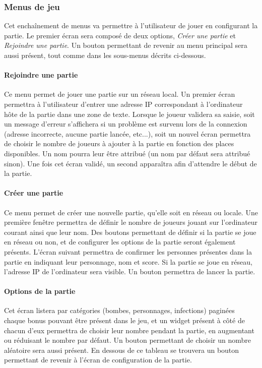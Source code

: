 \subsubsection{Menus de jeu}

Cet enchaînement de menus va permettre à l'utilisateur de jouer en configurant la partie. Le premier écran sera composé de deux options, \emph{Créer une partie} et \emph{Rejoindre une partie}. Un bouton permettant de revenir au menu principal sera aussi présent, tout comme dans les sous-menus décrits ci-dessous.

\paragraph{Rejoindre une partie}

Ce menu permet de jouer une partie sur un réseau local. Un premier écran permettra à l'utilisateur d'entrer une adresse IP correspondant à l'ordinateur hôte de la partie dans une zone de texte. Lorsque le joueur validera sa saisie, soit un message d'erreur s'affichera si un problème est survenu lors de la connexion (adresse incorrecte, aucune partie lancée, etc...), soit un nouvel écran permettra de choisir le nombre de joueurs à ajouter à la partie en fonction des places disponibles. Un nom pourra leur être attribué (un nom par défaut sera attribué sinon). Une fois cet écran validé, un second apparaîtra afin d'attendre le début de la partie.

\paragraph{Créer une partie}

Ce menu permet de créer une nouvelle partie, qu'elle soit en réseau ou locale. Une première fenêtre permettra de définir le nombre de joueurs jouant sur l'ordinateur courant ainsi que leur nom. Des boutons permettant de définir si la partie se joue en réseau ou non, et de configurer les options de la partie seront également présents. L'écran suivant permettra de confirmer les personnes présentes dans la partie en indiquant leur personnage, nom et score. Si la partie se joue en réseau, l'adresse IP de l'ordinateur sera visible. Un bouton permettra de lancer la partie.

\paragraph{Options de la partie}

Cet écran listera par catégories (bombes, personnages, infections) paginées chaque bonus pouvant être présent dans le jeu, et un widget présent à côté de chacun d'eux permettra de choisir leur nombre pendant la partie, en augmentant ou réduisant le nombre par défaut. Un bouton permettant de choisir un nombre aléatoire sera aussi présent. En dessous de ce tableau se trouvera un bouton permettant de revenir à l'écran de configuration de la partie.

